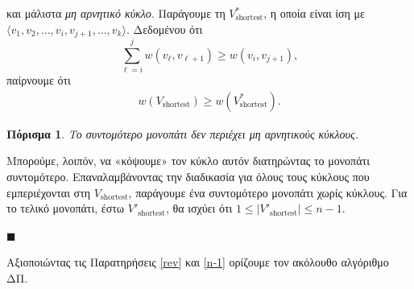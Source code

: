 \documentclass{article}
\newtheorem{cor}{Πόρισμα}
\begin{document}
και μάλιστα \emph{μη αρνητικό κύκλο}. Παράγουμε τη $V^*_{\text{shortest}}$, η οποία είναι ίση με $\langle v_1, v_2, \dots, v_{i}, v_{j + 1}, \dots, v_{k} \rangle$. Δεδομένου ότι 
\begin{equation*}
    \sum_{\ell = i}^{j} w(v_\ell, v_{\ell + 1}) \geq w(v_i, v_{j + 1}),
\end{equation*}
παίρνουμε ότι
\begin{align*}
    w\left(V_{\text{shortest}}\right) \geq w\left(V^*_{\text{shortest}}\right).
\end{align*}
\begin{cor}
    Το συντομότερο μονοπάτι δεν περιέχει μη αρνητικούς κύκλους.
\end{cor}
\noindent
Μπορούμε, λοιπόν, να «κόψουμε» τον κύκλο αυτόν διατηρώντας το μονοπάτι συντομότερο. Επαναλαμβάνοντας την διαδικασία για όλους τους κύκλους που εμπεριέχονται στη $V_{\text{shortest}}$, παράγουμε ένα συντομότερο μονοπάτι χωρίς κύκλους.
Για το τελικό μονοπάτι, έστω $V'_{\text{shortest}}$, θα ισχύει ότι $1 \leq |V'_{\text{shortest}}| \leq n - 1$.
\begin{flushright}
    $\blacksquare$ 
\end{flushright}
\noindent
Αξιοποιώντας τις Παρατηρήσεις \ref{rev} και \ref{n-1} ορίζουμε τον ακόλουθο αλγόριθμο ΔΠ.
\end{document}
